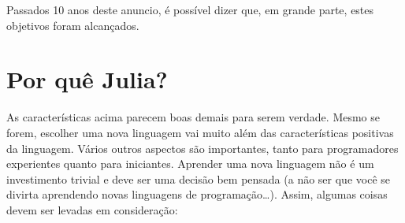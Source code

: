 \documentclass[
  notoc %
]{tufte-book}
\begin{document}
Passados 10 anos deste anuncio, é possível dizer que, em grande parte,
estes objetivos foram alcançados.

\hypertarget{sec:porquejulia}{%
\section{Por quê Julia?}\label{sec:porquejulia}}

As características acima parecem boas demais para serem verdade. Mesmo
se forem, escolher uma nova linguagem vai muito além das características
positivas da linguagem. Vários outros aspectos são importantes, tanto
para programadores experientes quanto para iniciantes. Aprender uma nova
linguagem não é um investimento trivial e deve ser uma decisão bem
pensada (a não ser que você se divirta aprendendo novas linguagens de
programação\ldots). Assim, algumas coisas devem ser levadas em
consideração:
\end{document}
